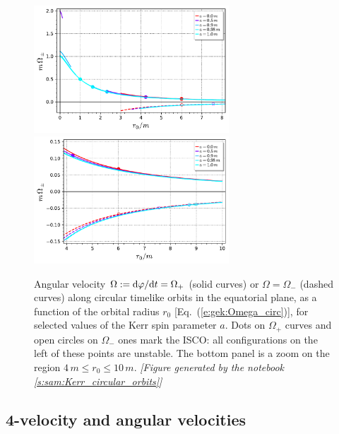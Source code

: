 \begin{figure}
\begin{center}
\includegraphics[width=0.65\textwidth]{gek_omega_circ_orb.pdf}\\
\includegraphics[width=0.65\textwidth]{gek_omega_circ_orb_zoom.pdf}
\end{center}
\caption[]{\label{f:gek:omega_circ_orb} \footnotesize
Angular velocity $\Omega:=\mathrm{d}\varphi/\mathrm{d} t=\Omega_+$ (solid curves) or $\Omega=\Omega_-$
(dashed curves) along circular timelike
orbits in the equatorial plane, as a function of the orbital radius $r_0$
[Eq.~(\ref{e:gek:Omega_circ})], for selected values of the Kerr spin parameter $a$.
Dots on $\Omega_+$ curves and open circles on $\Omega_-$ ones mark the ISCO: all
configurations on the left of these points are unstable.
The bottom panel is a zoom on the region $4\,m \leq r_0 \leq 10\,m$.
\textsl{[Figure generated by the notebook \ref{s:sam:Kerr_circular_orbits}]}
}
\end{figure}

\subsection{4-velocity and angular velocities}

